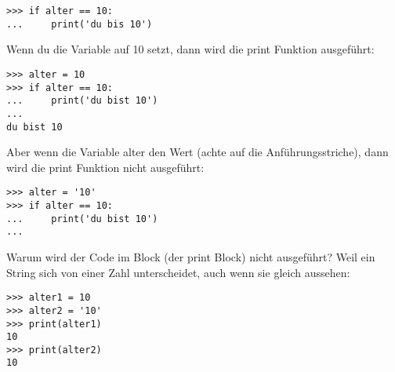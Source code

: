 \begin{listing}
\begin{verbatim}
>>> if alter == 10:
...     print('du bis 10')
\end{verbatim}
\end{listing}

Wenn du die Variable auf 10 setzt, dann wird die print Funktion ausgeführt:

\begin{listing}
\begin{verbatim}
>>> alter = 10
>>> if alter == 10:
...     print('du bist 10')
...
du bist 10
\end{verbatim}
\end{listing}

Aber wenn die Variable alter den Wert  (achte auf die Anführungsstriche), dann wird die print Funktion nicht ausgeführt:

\begin{listing}
\begin{verbatim}
>>> alter = '10'
>>> if alter == 10:
...     print('du bist 10')
...
\end{verbatim}
\end{listing}

Warum wird der Code im Block (der print Block) nicht ausgeführt? Weil ein String sich von einer Zahl unterscheidet, auch wenn sie gleich aussehen:

\begin{listing}
\begin{verbatim}
>>> alter1 = 10
>>> alter2 = '10'
>>> print(alter1)
10
>>> print(alter2)
10
\end{verbatim}
\end{listing}

